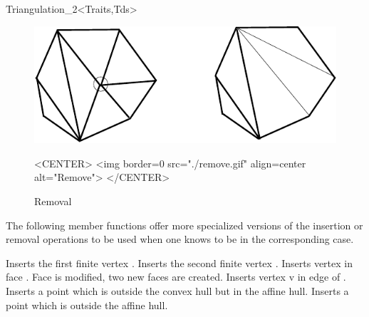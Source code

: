 \begin{ccRefClass}{Triangulation_2<Traits,Tds>}
\begin{figure}
\begin{ccTexOnly}
\begin{center}
\includegraphics{Triangulation_2/remove}
\end{center}
\end{ccTexOnly}
\caption{Removal
\label{Triangulation_ref_Fig_remove}}

\begin{ccHtmlOnly}
<CENTER>
<img border=0 src="./remove.gif" align=center alt="Remove">
</CENTER>
\end{ccHtmlOnly}
\end{figure}

\begin{ccAdvanced}
The following member functions offer more specialized versions of the
insertion or removal operations to be used when one knows to be in the
corresponding case.

{Inserts the first finite  vertex .}
{Inserts the second finite  vertex .}
 {Inserts vertex  in face
. Face  is modified,
two new faces are created.
}
{Inserts vertex v in edge  of .
}
{Inserts 
 a point which is outside the convex hull  but in the affine hull.
 }
{Inserts 
 a point which is outside the affine hull.}


\end{ccAdvanced}
\end{ccRefClass}
